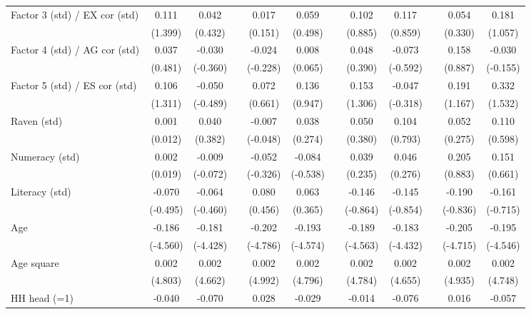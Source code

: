 {\begin{longtable}{@{\extracolsep{\fill}}lccccccccccc}
    Factor 3 (std) / EX cor (std) & 0.111 & 0.042 &       & 0.017 & 0.059 &       & 0.102 & 0.117 &       & 0.054 & 0.181 \\
          & (1.399) & (0.432) &       & (0.151) & (0.498) &       & (0.885) & (0.859) &       & (0.330) & (1.057) \\
    Factor 4 (std) / AG cor (std) & 0.037 & -0.030 &       & -0.024 & 0.008 &       & 0.048 & -0.073 &       & 0.158 & -0.030 \\
          & (0.481) & (-0.360) &       & (-0.228) & (0.065) &       & (0.390) & (-0.592) &       & (0.887) & (-0.155) \\
    Factor 5 (std) / ES cor (std) & 0.106 & -0.050 &       & 0.072 & 0.136 &       & 0.153 & -0.047 &       & 0.191 & 0.332 \\
          & (1.311) & (-0.489) &       & (0.661) & (0.947) &       & (1.306) & (-0.318) &       & (1.167) & (1.532) \\
    Raven (std) & 0.001 & 0.040 &       & -0.007 & 0.038 &       & 0.050 & 0.104 &       & 0.052 & 0.110 \\
          & (0.012) & (0.382) &       & (-0.048) & (0.274) &       & (0.380) & (0.793) &       & (0.275) & (0.598) \\
    Numeracy (std) & 0.002 & -0.009 &       & -0.052 & -0.084 &       & 0.039 & 0.046 &       & 0.205 & 0.151 \\
          & (0.019) & (-0.072) &       & (-0.326) & (-0.538) &       & (0.235) & (0.276) &       & (0.883) & (0.661) \\
    Literacy (std) & -0.070 & -0.064 &       & 0.080 & 0.063 &       & -0.146 & -0.145 &       & -0.190 & -0.161 \\
          & (-0.495) & (-0.460) &       & (0.456) & (0.365) &       & (-0.864) & (-0.854) &       & (-0.836) & (-0.715) \\
    Age   & -0.186 & -0.181 &       & -0.202 & -0.193 &       & -0.189 & -0.183 &       & -0.205 & -0.195 \\
          & (-4.560) & (-4.428) &       & (-4.786) & (-4.574) &       & (-4.563) & (-4.432) &       & (-4.715) & (-4.546) \\
    Age square & 0.002 & 0.002 &       & 0.002 & 0.002 &       & 0.002 & 0.002 &       & 0.002 & 0.002 \\
          & (4.803) & (4.662) &       & (4.992) & (4.796) &       & (4.784) & (4.655) &       & (4.935) & (4.748) \\
    HH head (=1) & -0.040 & -0.070 &       & 0.028 & -0.029 &       & -0.014 & -0.076 &       & 0.016 & -0.057 \\

\end{longtable}}
